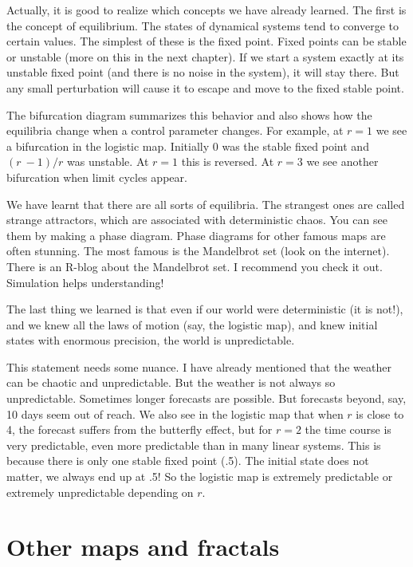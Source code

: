 \documentclass[
  letterpaper,
]{scrbook}
\begin{document}
Actually, it is good to realize which concepts we have already learned.
The first is the concept of equilibrium. The states of dynamical systems
tend to converge to certain values. The simplest of these is the fixed
point. Fixed points can be stable or unstable (more on this in the next
chapter). If we start a system exactly at its unstable fixed point (and
there is no noise in the system), it will stay there. But any small
perturbation will cause it to escape and move to the fixed stable point.

The bifurcation diagram summarizes this behavior and also shows how the
equilibria change when a control parameter changes. For example, at
\(r = 1\) we see a bifurcation in the logistic map. Initially 0 was the
stable fixed point and \((r\  - 1)/r\) was unstable. At \(r = 1\) this
is reversed. At \(r = 3\) we see another bifurcation when limit cycles
appear.

We have learnt that there are all sorts of equilibria. The strangest
ones are called strange attractors, which are associated with
deterministic chaos. You can see them by making a phase diagram. Phase
diagrams for other famous maps are often stunning. The most famous is
the Mandelbrot set (look on the internet). There is an R-blog about the
Mandelbrot set. I recommend you check it out. Simulation helps
understanding!

The last thing we learned is that even if our world were deterministic
(it is not!), and we knew all the laws of motion (say, the logistic
map), and knew initial states with enormous precision, the world is
unpredictable.

This statement needs some nuance. I have already mentioned that the
weather can be chaotic and unpredictable. But the weather is not always
so unpredictable. Sometimes longer forecasts are possible. But forecasts
beyond, say, 10 days seem out of reach. We also see in the logistic map
that when \(r\) is close to 4, the forecast suffers from the butterfly
effect, but for \(r = 2\) the time course is very predictable, even more
predictable than in many linear systems. This is because there is only
one stable fixed point (.5). The initial state does not matter, we
always end up at .5! So the logistic map is extremely predictable or
extremely unpredictable depending on \(r\).

\hypertarget{other-maps-and-fractals}{%
\section{Other maps and fractals}\label{other-maps-and-fractals}}
\end{document}
